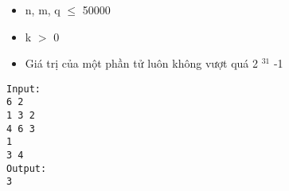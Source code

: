 \begin{itemize}
	\item     n, m, q  $\le$  50000   
	\item     k $>$ 0   
	\item     Giá trị của một phần tử luôn không vượt quá 2    $^     31    $    -1   
\end{itemize}
\begin{verbatim}
Input:
6 2
1 3 2
4 6 3
1
3 4
Output:
3
\end{verbatim}